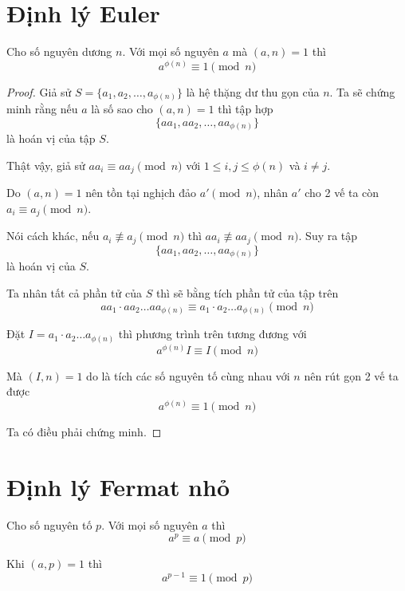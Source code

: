 \section{Định lý Euler}

    \begin{theorem}    
        Cho số nguyên dương $n$. Với mọi số nguyên $a$ mà $(a, n) = 1$ thì 
        \[a^{\phi(n)} \equiv 1 \pmod n\]
    \end{theorem}

\begin{proof}
    Giả sử $S = \{a_1, a_2, \ldots, a_{\phi(n)}\}$ là hệ thặng dư thu gọn của $n$. Ta sẽ chứng minh rằng nếu $a$ là số sao cho $(a, n)=1$ thì tập hợp
    $$\{a a_1, a a_2, \ldots, a a_{\phi(n)}\}$$ là hoán vị của tập $S$.

    Thật vậy, giả sử $a a_i \equiv a a_j \pmod n$ với $1 \leq i, j \leq \phi(n)$ và $i \neq j$.

    Do $(a, n) = 1$ nên tồn tại nghịch đảo $a' \pmod n$, nhân $a'$ cho 2 vế ta còn $a_i \equiv a_j \pmod n$.

    Nói cách khác, nếu $a_i \not\equiv a_j \pmod n$ thì $a a_i \not\equiv a a_j \pmod n$. Suy ra tập
    $$\{a a_1, a a_2, \ldots, a a_{\phi(n)}\}$$ là hoán vị của $S$.

    Ta nhân tất cả phần tử của $S$ thì sẽ bằng tích phần tử của tập trên
    $$a a_1 \cdot a a_2 \ldots a a_{\phi(n)} \equiv a_1 \cdot a_2 \ldots a_{\phi(n)} \pmod n$$

    Đặt $I = a_1 \cdot a_2 \ldots a_{\phi(n)}$ thì phương trình trên tương đương với 
    $$a^{\phi(n)} I \equiv I \pmod n$$
    
    Mà $(I, n) = 1$ do là tích các số nguyên tố cùng nhau với $n$ nên rút gọn 2 vế ta được
    $$a^{\phi(n)} \equiv 1 \pmod n$$

    Ta có điều phải chứng minh.
\end{proof}

\section{Định lý Fermat nhỏ}

    \begin{theorem}    
    Cho số nguyên tố $p$. Với mọi số nguyên $a$ thì $$a^p \equiv a \pmod p$$

    Khi $(a, p) = 1$ thì \[a^{p-1} \equiv 1 \pmod p\]
    \end{theorem}

